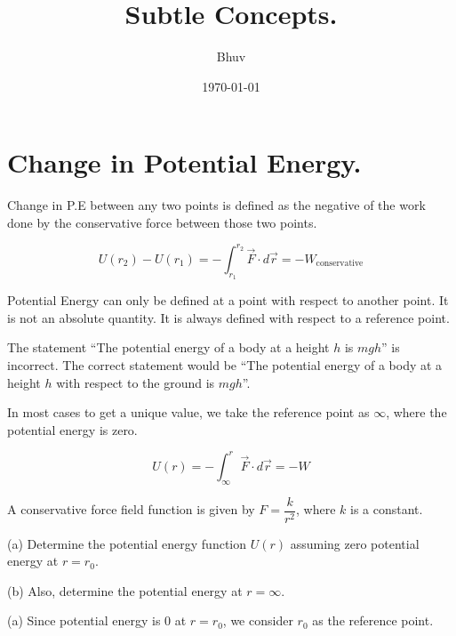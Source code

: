 \documentclass[twocolumn]{article}
\title{\textbf{Subtle Concepts.}}
\author{ Bhuv }
\date{\today}
\begin{document}
\maketitle    

\section*{Change in Potential Energy.}

Change in P.E between any two points is defined as the negative of the work done by the conservative force between those two points.

\[
    U (r_2) - U (r_1) = - \int _{r_1} ^{r_2} \vec{F} \cdot d\vec{r} = - W_{\text{conservative}}
\]

Potential Energy can only be defined at a point with respect to another point. It is not an absolute quantity. It is always defined with respect to a reference point.

\vspace{0.1in}

\begin{imp}
    The statement ``The potential energy of a body at a height $h$ is $mgh$'' is incorrect. The correct statement would be ``The potential energy of a body at a height $h$ with respect to the ground is $mgh$''. 
\end{imp}

\vspace{0.1in}

In most cases to get a unique value, we take the reference point as \(\infty\), where the potential energy is zero. 

\[
    U (r) = - \int_{\infty} ^{r} \vec{F} \cdot d\vec{r} = - W
\]

\vspace{0.1in}

\begin{question}
    A conservative force field function is given by \(F = \dfrac{k}{r^{2} }\), where \(k\) is a constant.
    \vspace{0.1in}

    (a) Determine the potential energy function \(U(r)\) assuming zero potential energy at \(r = r_0\).

    \vspace{0.1in}
    (b) Also, determine the potential energy at \(r = \infty\). 
\end{question}

(a) Since potential energy is 0 at \(r = r_0\), we consider \(r_0\) as the reference point. 
\end{document}
